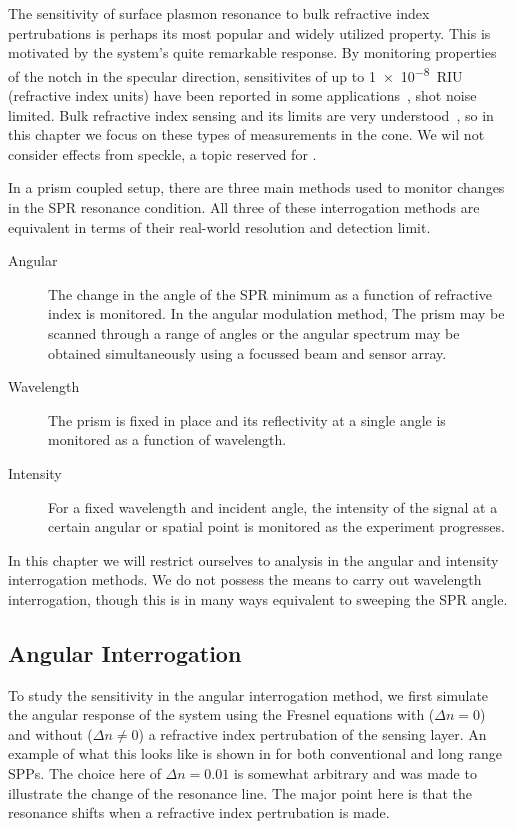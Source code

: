 The sensitivity of surface plasmon resonance to bulk refractive index
pertrubations is perhaps its most popular and widely utilized property.
This is motivated by the system's quite remarkable response. By monitoring
properties of the notch in the specular direction, sensitivites of up to
\SI{1e-8}{RIU} (refractive index units) have been reported in some
applications~\cite{fan2008sensitive}, shot noise limited.  Bulk refractive
index sensing and its limits are very
understood~\cite{piliarik2009surface}, so in this chapter we focus on these
types of measurements in the cone.  We wil not consider effects from
speckle, a topic reserved for .  

In a prism coupled setup, there are three main methods used to
monitor changes in the SPR resonance condition.  All three of these
interrogation methods are equivalent in terms of their real-world
resolution and detection limit.~\cite{homola2006surface}
\begin{description}
	\item [{Angular}] The change in the angle of the SPR minimum as a function
					of refractive index is monitored.  In the angular modulation method,
					The prism may be scanned through a range of angles or the angular
					spectrum may be obtained simultaneously using a focussed beam and
					sensor array.
 \item [{Wavelength}] The prism is fixed in place and its reflectivity at
  a single angle is monitored as a function of wavelength.
	\item [{Intensity}] For a fixed wavelength and incident angle, the
		intensity of the signal at a certain angular or spatial point is
		monitored as the experiment progresses.
\end{description}
In this chapter we will restrict ourselves to analysis in the angular and
intensity interrogation methods.  We do not possess the means to carry out
wavelength interrogation, though this is in many ways equivalent to
sweeping the SPR angle. 

\subsection{Angular Interrogation}
To study the sensitivity in the angular interrogation method, we first
simulate the angular response of the system using the Fresnel equations
with ($\Delta n = 0$) and without ($\Delta n \ne 0$) a refractive index
pertrubation of the sensing layer.  An example of what this looks like is
shown in  for both conventional and long range
SPPs.  The choice here of 
$\Delta n = 0.01$ is somewhat arbitrary and was made to 
illustrate the change of the resonance line.  The major point here is that
the resonance shifts when a refractive index pertrubation is made.

